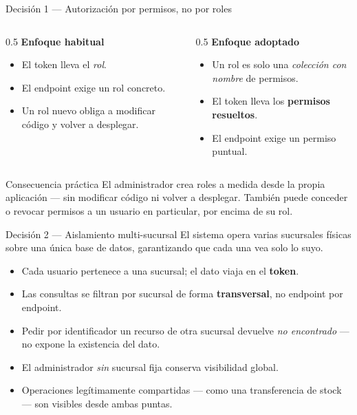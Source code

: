 \documentclass[11pt,aspectratio=169]{beamer}
\begin{document}
\begin{frame}{Decisión 1 --- Autorización por permisos, no por roles}
  \begin{columns}[T,onlytextwidth]
    \begin{column}{0.5\textwidth}
      \textbf{Enfoque habitual}
      \begin{itemize}\small
        \item El token lleva el \emph{rol}.
        \item El endpoint exige un rol concreto.
        \item Un rol nuevo obliga a modificar código y volver a desplegar.
      \end{itemize}
    \end{column}
    \begin{column}{0.5\textwidth}
      \textbf{Enfoque adoptado}
      \begin{itemize}\small
        \item Un rol es solo una \emph{colección con nombre} de permisos.
        \item El token lleva los \textbf{permisos resueltos}.
        \item El endpoint exige un permiso puntual.
      \end{itemize}
    \end{column}
  \end{columns}

  \vspace{10pt}
  \begin{block}{Consecuencia práctica}
    El administrador crea roles a medida desde la propia aplicación
    --- sin modificar código ni volver a desplegar. También puede conceder o
    revocar permisos a un usuario en particular, por encima de su rol.
  \end{block}
\end{frame}

\begin{frame}{Decisión 2 --- Aislamiento multi-sucursal}
  El sistema opera varias sucursales físicas sobre \alert{una única base de datos},
  garantizando que cada una vea solo lo suyo.

  \vspace{8pt}
  \begin{itemize}
    \item Cada usuario pertenece a una sucursal; el dato viaja en el \textbf{token}.
    \item Las consultas se filtran por sucursal de forma \textbf{transversal},
          no endpoint por endpoint.
    \item Pedir por identificador un recurso de otra sucursal devuelve
          \emph{no encontrado} --- no expone la existencia del dato.
    \item El administrador \emph{sin} sucursal fija conserva visibilidad global.
    \item Operaciones legítimamente compartidas --- como una transferencia de stock
          --- son visibles desde ambas puntas.
  \end{itemize}
\end{frame}
\end{document}
